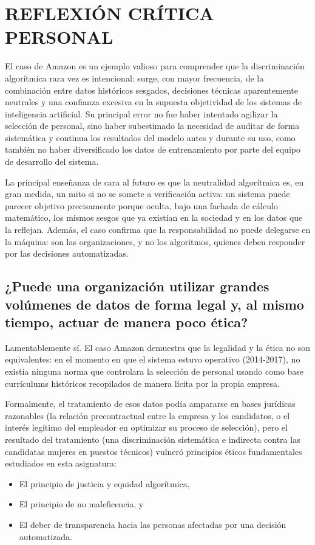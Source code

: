 \chapter{REFLEXIÓN CRÍTICA PERSONAL}

El caso de Amazon es un ejemplo valioso para comprender que la discriminación algorítmica rara vez es intencional: surge, con mayor frecuencia, de la combinación entre datos históricos sesgados, decisiones técnicas aparentemente neutrales y una confianza excesiva en la supuesta objetividad de los sistemas de inteligencia artificial. Su principal error no fue haber intentado agilizar la selección de personal, sino haber subestimado la necesidad de auditar de forma sistemática y continua los resultados del modelo antes y durante su uso, como también no haber diversificado los datos de entrenamiento por parte del equipo de desarrollo del sistema.

La principal enseñanza de cara al futuro es que la neutralidad algorítmica es, en gran medida, un mito si no se somete a verificación activa: un sistema puede parecer objetivo precisamente porque oculta, bajo una fachada de cálculo matemático, los mismos sesgos que ya existían en la sociedad y en los datos que la reflejan. Además, el caso confirma que la responsabilidad no puede delegarse en la máquina: son las organizaciones, y no los algoritmos, quienes deben responder por las decisiones automatizadas.

\section{¿Puede una organización utilizar grandes volúmenes de datos de forma legal y, al mismo tiempo, actuar de manera poco ética?}

Lamentablemente sí. El caso Amazon demuestra que la legalidad y la ética no son equivalentes: en el momento en que el sistema estuvo operativo (2014-2017), no existía ninguna norma que controlara la selección de personal usando como base currículums históricos recopilados de manera lícita por la propia empresa.

Formalmente, el tratamiento de esos datos podía ampararse en bases jurídicas razonables (la relación precontractual entre la empresa y los candidatos, o el interés legítimo del empleador en optimizar su proceso de selección), pero el resultado del tratamiento (una discriminación sistemática e indirecta contra las candidatas mujeres en puestos técnicos) vulneró principios éticos fundamentales estudiados en esta asignatura:
\begin{itemize}
    \item El principio de justicia y equidad algorítmica,
    \item El principio de no maleficencia, y
    \item El deber de transparencia hacia las personas afectadas por una decisión automatizada.
\end{itemize}

